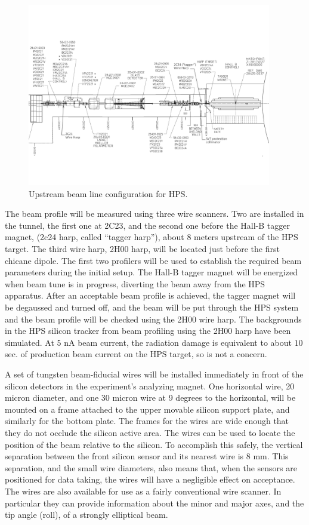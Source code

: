 \begin{figure}[!ht]
\includegraphics[angle=90, width=0.95\textwidth]{beamline/upstream_beamline}
\caption{\small{Upstream beam line configuration for HPS.}}\label{fig:upstream_beamline}
\end{figure}

The beam profile will be measured using three wire scanners. Two are installed in the tunnel, the first one at 2C23, and the second one before the 
Hall-B tagger magnet, (2c24 harp, called ``tagger harp''), about 8 meters upstream of the HPS target. The third wire harp, 2H00 harp, will 
be located just before the first chicane dipole. The first two profilers will be used to establish the required beam parameters during the 
initial setup. The Hall-B tagger magnet will be energized when beam tune is in progress, diverting the beam away from the HPS apparatus.
After an acceptable beam profile is achieved, the tagger magnet will be degaussed and turned off, and the beam 
will be put through the HPS system and the beam profile will be checked using the 2H00 wire harp. 
The backgrounds in the HPS silicon tracker from beam profiling using the 2H00 harp have been simulated. At $5$ nA beam current, the 
radiation damage is equivalent to about $10$ sec. of production beam current on the HPS target, so is not a concern.

A set of tungsten beam-fiducial wires will be installed immediately in front of the silicon detectors in the experiment's analyzing magnet. One horizontal wire, 20 micron diameter, and one 30 micron wire at 9 degrees to the horizontal, will be mounted on a frame attached to the upper movable silicon support plate, and similarly for the bottom plate. The frames for the wires are wide enough that they do not occlude the silicon active area. The wires can be used to locate the position of the beam relative to the silicon. To accomplish this safely, the vertical separation between the front silicon sensor and its nearest wire is 8 mm. This separation, and the small wire diameters, also means that, when the sensors are positioned for data taking, the wires will have a negligible effect on acceptance. The wires are also available for use as a fairly conventional wire scanner. In particular they can provide information about the minor and major axes, and the tip angle (roll), of a strongly elliptical beam.

